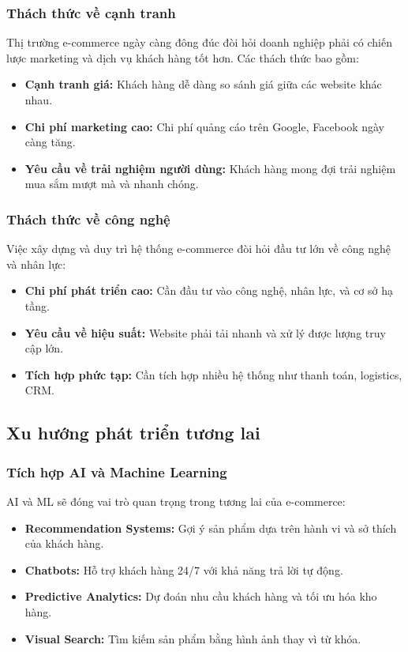 \documentclass[a4paper,12pt]{report}
\begin{document}
\subsubsection{Thách thức về cạnh tranh}
Thị trường e-commerce ngày càng đông đúc đòi hỏi doanh nghiệp phải có chiến lược marketing và dịch vụ khách hàng tốt hơn. Các thách thức bao gồm:
\begin{itemize}
    \item \textbf{Cạnh tranh giá:} Khách hàng dễ dàng so sánh giá giữa các website khác nhau.
    \item \textbf{Chi phí marketing cao:} Chi phí quảng cáo trên Google, Facebook ngày càng tăng.
    \item \textbf{Yêu cầu về trải nghiệm người dùng:} Khách hàng mong đợi trải nghiệm mua sắm mượt mà và nhanh chóng.
\end{itemize}

\subsubsection{Thách thức về công nghệ}
Việc xây dựng và duy trì hệ thống e-commerce đòi hỏi đầu tư lớn về công nghệ và nhân lực:
\begin{itemize}
    \item \textbf{Chi phí phát triển cao:} Cần đầu tư vào công nghệ, nhân lực, và cơ sở hạ tầng.
    \item \textbf{Yêu cầu về hiệu suất:} Website phải tải nhanh và xử lý được lượng truy cập lớn.
    \item \textbf{Tích hợp phức tạp:} Cần tích hợp nhiều hệ thống như thanh toán, logistics, CRM.
\end{itemize}

\subsection{Xu hướng phát triển tương lai}

\subsubsection{Tích hợp AI và Machine Learning}
AI và ML sẽ đóng vai trò quan trọng trong tương lai của e-commerce:
\begin{itemize}
    \item \textbf{Recommendation Systems:} Gợi ý sản phẩm dựa trên hành vi và sở thích của khách hàng.
    \item \textbf{Chatbots:} Hỗ trợ khách hàng 24/7 với khả năng trả lời tự động.
    \item \textbf{Predictive Analytics:} Dự đoán nhu cầu khách hàng và tối ưu hóa kho hàng.
    \item \textbf{Visual Search:} Tìm kiếm sản phẩm bằng hình ảnh thay vì từ khóa.
\end{itemize}
\end{document}
